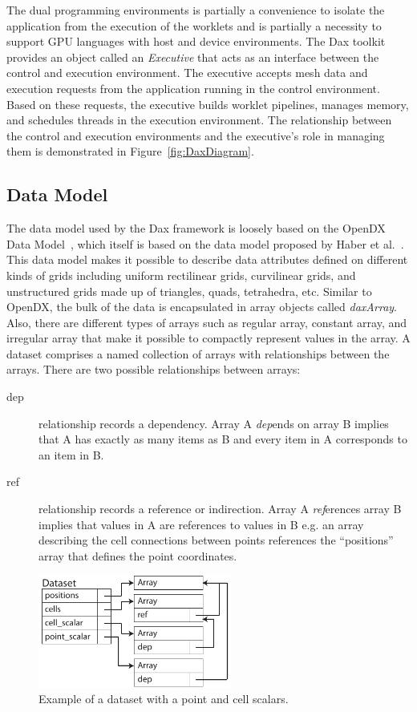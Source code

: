 \documentclass{vgtc}                          %
\newcommand*{\lcite}[1]{~\cite{#1}}
\newcommand*{\scite}[1]{~\cite{#1}}
\newcommand*{\keyterm}[1]{\emph{#1}}
\newcommand{\etal}{et al.}
\begin{document}
The dual programming environments is partially a convenience to isolate the
application from the execution of the worklets and is partially a necessity to
support GPU languages with host and device environments.  The Dax toolkit
provides an object called an \keyterm{Executive} that acts as an interface
between the control and execution environment.  The executive accepts mesh data
and execution requests from the application running in the control environment.
Based on these requests, the executive builds worklet pipelines, manages memory,
and schedules threads in the execution environment.  The relationship between
the control and execution environments and the executive's role in managing them
is demonstrated in Figure~\ref{fig:DaxDiagram}.

\subsection{Data Model}
\label{sec:DataModel}

The data model used by the Dax framework is loosely based on the OpenDX Data Model\lcite{OpenDXManual},
which itself is based on the data model proposed by Haber \etal\scite{Haber1991}.
This data model makes it possible to describe data attributes defined on
different kinds of grids including uniform rectilinear grids, curvilinear grids,
and unstructured grids made up of triangles, quads, tetrahedra, etc. Similar
to OpenDX, the bulk of the data is encapsulated in array objects called
\emph{daxArray}. Also, there are different types of arrays such as
regular array, constant array, and irregular array that make it possible to
compactly represent values in the array. A dataset comprises a named
collection of arrays with relationships between the arrays. There are two
possible relationships between arrays:
\begin{description}
\item[dep] relationship records a dependency. Array A \emph{dep}ends on
array B implies that A has exactly as many items as B and every item in A
corresponds to an item in B.
\item[ref] relationship records a reference or indirection. Array A
\emph{ref}erences array B implies that values in A are references to values in
B e.g. an array describing the cell connections between points references the
``positions'' array that defines the point coordinates.
\end{description}

\begin{figure}
  \centering
  \includegraphics[width=2.5in]{images/DaxDataModel}
  \caption{Example of a dataset with a point and cell scalars.}
  \label{fig:DaxDataModel}
\end{figure}
\end{document}
